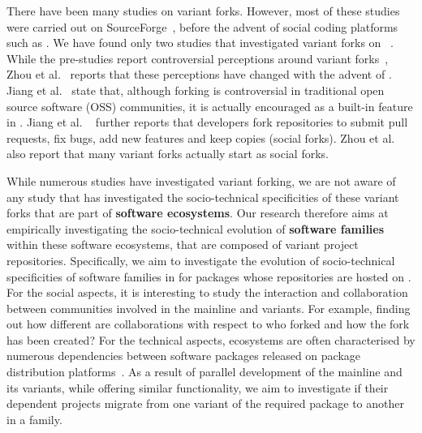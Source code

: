 There have been many studies on variant forks. However, most of these studies were carried out on \textsf{SourceForge}~\cite{Linus:2012Perspectives,Gregorio:2012,Viseur:2012Forks,Linus:2013CodeForking,Laurent:2008,Linus:2011ToFork}, before the advent of social coding platforms such as \gh.
We have found only two studies that investigated variant forks on \gh~\cite{businge2018appfamilies,Zhou:2020}.
While the pre-\gh studies report controversial perceptions around variant forks~\cite{Chua:Forking:2017,Dixion:2009Forks,Ernst:2010,Linus:2011ToFork,Linus:2014Hackers,Raymond:Cathedral:2001}, Zhou et al.~\cite{Zhou:2020} reports that these perceptions have changed with the advent of \gh. Jiang et al.~\cite{Lo:2017} state that, although forking is controversial in traditional open source software (OSS) communities, it is actually encouraged as a built-in feature in \gh. Jiang et al. ~\cite{Lo:2017} further reports that developers fork repositories to submit pull requests, fix bugs, add new features and keep copies (social forks).
Zhou et al.~\cite{Zhou:2020} also report that many variant forks actually start as social forks.

While numerous studies have investigated variant forking, we are not aware of any study that has investigated the socio-technical specificities of these variant forks that are part of \textbf{software ecosystems}.
Our research therefore aims at empirically investigating the socio-technical evolution of \textbf{software families} within these software ecosystems, that are composed of variant project repositories. Specifically, we aim to investigate the evolution of socio-technical specificities of software families in \np for \js packages whose repositories are hosted on \gh.
For the social aspects, it is interesting to study the interaction and collaboration between communities involved in the mainline and variants.
For example, finding out how different are collaborations with respect to who forked and how the fork has been created?
For the technical aspects, ecosystems are often characterised by numerous dependencies between software packages released on package distribution platforms~\cite{decan:2016:ECSAW}. 
As a result of parallel development of the mainline and its variants, while offering similar functionality, we aim to investigate if their dependent projects migrate from one variant of the required package to another in a family.

